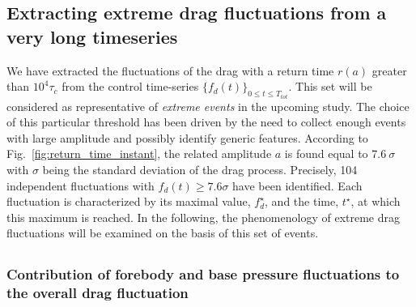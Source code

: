 \documentclass{jfm}
\newcommand{\EL}[1]{{\color{myred}{#1}}}
\begin{document}



\subsection{Extracting extreme drag fluctuations from a very long timeseries}
\label{sec:extreme_extraction}

%
We have extracted the fluctuations of the drag with a return time $r(a)$ greater than  $10^4\tau_c$ from the control time-series $\{f_d(t)\}_{0 \leq t \leq T_{tot}}$.
This set will be considered as representative of \emph{extreme events} in the upcoming study.
The choice of this particular threshold has been driven by the need to collect enough events with large amplitude and possibly identify generic features.
%
According to Fig.~\ref{fig:return_time_instant}, the related amplitude $a$ is found equal to $7.6~\sigma$ with $\sigma$ being the standard deviation of the drag process.
Precisely, 104 independent fluctuations with $f_d(t) \geq 7.6\sigma$ have been identified. Each fluctuation is characterized by its maximal value, $f_d^{\star}$, and the time, $t^{\star}$, at which this maximum is reached.
%
In the following, the phenomenology of extreme drag fluctuations will be examined on the basis of this set of events.

\subsection{\EL{Extreme fluctuations of the instantaneous drag}}
\label{sec:instantaneous_drag}

\subsubsection{Contribution of forebody and base pressure fluctuations to the overall drag fluctuation}
\label{sec:forebody_and_base_contribution}
\end{document}
